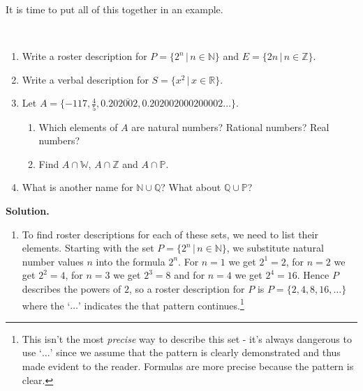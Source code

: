\documentclass{ximera}
\begin{document}
 

It is time to put all of this together in an example.

\begin{example} \label{numbersetex}   $~$

\begin{enumerate}

\item  Write a roster description for $P = \{ 2^{n} \, | \, n \in \mathbb{N} \}$  and $E = \{ 2n \, | \, n \in \mathbb Z \}$.

\item Write a verbal description for $S = \{ x^2 \, | \, x \in \mathbb{R}\}$.

\item Let $A = \{-117, \frac{4}{5}, 0.20\overline{2002}, 0.202002000200002 \ldots\}$. 

\begin{enumerate}

\item Which elements of $A$ are natural numbers?  Rational numbers?  Real numbers?

\item Find $A \cap \mathbb W$, $A \cap \mathbb Z$ and $A \cap \mathbb P$.

\end{enumerate}

\item  What is another name for $\mathbb{N} \cup \mathbb{Q}$?  What about  $\mathbb{Q}\cup \mathbb P$?

\end{enumerate}

{\bf Solution.}

\begin{enumerate}

\item  To find roster descriptions for each of these sets, we need to list their elements.   Starting with the set $P = \{ 2^{n} \, | \, n \in \mathbb{N} \}$, we substitute natural number values $n$ into the formula $2^n$.  For $n = 1$ we get $2^1 = 2$,  for $n = 2$ we get $2^2 = 4$, for $n = 3$ we get $2^3 = 8$ and for $n = 4$ we get $2^4 = 16$.  Hence  $P$ describes the powers of $2$, so a roster description for $P$ is $P = \{ 2, 4, 8, 16, \ldots \}$ where the `$\ldots$' indicates the that pattern continues.\footnote{This isn't the most \textit{precise} way to describe this set - it's always dangerous to use `$\ldots$' since we assume that the pattern is clearly demonstrated and thus made evident to the reader.  Formulas are more precise because the pattern is clear.}  


\end{enumerate}
\end{example}
\end{document}
